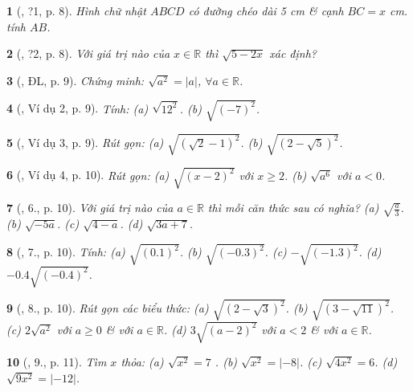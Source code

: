 \documentclass{article}
\newtheorem{baitoan}{}
\begin{document}
\begin{baitoan}[\cite{SGK_Toan_9_tap_1}, ?1, p. 8]
	Hình chữ nhật $ABCD$ có đường chéo dài \emph{5 cm} \& cạnh $BC =  x$ \emph{cm}. tính $AB$.
\end{baitoan}

\begin{baitoan}[\cite{SGK_Toan_9_tap_1}, ?2, p. 8]
	Với giá trị nào của $x\in\mathbb{R}$ thì $\sqrt{5 - 2x}$ xác định?
\end{baitoan}

\begin{baitoan}[\cite{SGK_Toan_9_tap_1}, ĐL, p. 9]
	Chứng minh: $\sqrt{a^2} = |a|$, $\forall a\in\mathbb{R}$.
\end{baitoan}

\begin{baitoan}[\cite{SGK_Toan_9_tap_1}, Ví dụ 2, p. 9]
	Tính: (a) $\sqrt{12^2}$. (b) $\sqrt{(-7)^2}$.
\end{baitoan}

\begin{baitoan}[\cite{SGK_Toan_9_tap_1}, Ví dụ 3, p. 9]
	Rút gọn: (a) $\sqrt{(\sqrt{2} - 1)^2}$. (b) $\sqrt{(2 - \sqrt{5})^2}$.
\end{baitoan}

\begin{baitoan}[\cite{SGK_Toan_9_tap_1}, Ví dụ 4, p. 10]
	Rút gọn: (a) $\sqrt{(x - 2)^2}$ với $x\ge2$. (b) $\sqrt{a^6}$ với $a < 0$.
\end{baitoan}

\begin{baitoan}[\cite{SGK_Toan_9_tap_1}, 6., p. 10]
	Với giá trị nào của $a\in\mathbb{R}$ thì mỗi căn thức sau có nghĩa? (a) $\sqrt{\frac{a}{3}}$. (b) $\sqrt{-5a}$. (c) $\sqrt{4 - a}$. (d) $\sqrt{3a + 7}$.
\end{baitoan}

\begin{baitoan}[\cite{SGK_Toan_9_tap_1}, 7., p. 10]
	Tính: (a) $\sqrt{(0.1)^2}$. (b) $\sqrt{(-0.3)^2}$. (c) $-\sqrt{(-1.3)^2}$. (d) $-0.4\sqrt{(-0.4)^2}$.
\end{baitoan}

\begin{baitoan}[\cite{SGK_Toan_9_tap_1}, 8., p. 10]
	Rút gọn các biểu thức: (a) $\sqrt{(2 - \sqrt{3})^2}$. (b) $\sqrt{(3 - \sqrt{11})^2}$. (c) $2\sqrt{a^2}$ với $a\ge0$ \& với $a\in\mathbb{R}$. (d) $3\sqrt{(a - 2)^2}$ với $a < 2$ \& với $a\in\mathbb{R}$.
\end{baitoan}

\begin{baitoan}[\cite{SGK_Toan_9_tap_1}, 9., p. 11]
	Tìm $x$ thỏa: (a) $\sqrt{x^2} = 7$ . (b) $\sqrt{x^2} = |-8|$. (c) $\sqrt{4x^2} = 6$. (d) $\sqrt{9x^2} = |-12|$.
\end{baitoan}
\end{document}
